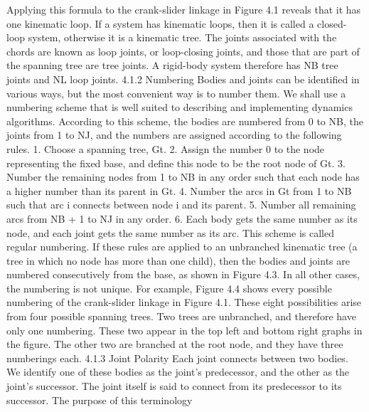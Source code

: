 Applying this formula to the crank-slider linkage in Figure 4.1 reveals that it has one kinematic loop. If a system has kinematic loops, then it is called a closed-loop system, otherwise it is a kinematic tree. The joints associated with the chords are known as loop joints, or loop-closing joints, and those that are part of the spanning tree are tree joints. A rigid-body system therefore has NB tree joints and NL loop joints. 4.1.2 Numbering Bodies and joints can be identified in various ways, but the most convenient way is to number them. We shall use a numbering scheme that is well suited to describing and implementing dynamics algorithms. According to this scheme, the bodies are numbered from 0 to NB, the joints from 1 to NJ, and the numbers are assigned according to the following rules. 1. Choose a spanning tree, Gt. 2. Assign the number 0 to the node representing the fixed base, and define this node to be the root node of Gt. 3. Number the remaining nodes from 1 to NB in any order such that each node has a higher number than its parent in Gt. 4. Number the arcs in Gt from 1 to NB such that arc i connects between node i and its parent. 5. Number all remaining arcs from NB + 1 to NJ in any order. 6. Each body gets the same number as its node, and each joint gets the same number as its arc. This scheme is called regular numbering. If these rules are applied to an unbranched kinematic tree (a tree in which no node has more than one child), then the bodies and joints are numbered consecutively from the base, as shown in Figure 4.3. In all other cases, the numbering is not unique. For example, Figure 4.4 shows every possible numbering of the crank-slider linkage in Figure 4.1. These eight possibilities arise from four possible spanning trees. Two trees are unbranched, and therefore have only one numbering. These two appear in the top left and bottom right graphs in the figure. The other two are branched at the root node, and they have three numberings each. 4.1.3 Joint Polarity Each joint connects between two bodies. We identify one of these bodies as the joint’s predecessor, and the other as the joint’s successor. The joint itself is said to connect from its predecessor to its successor. The purpose of this terminology

